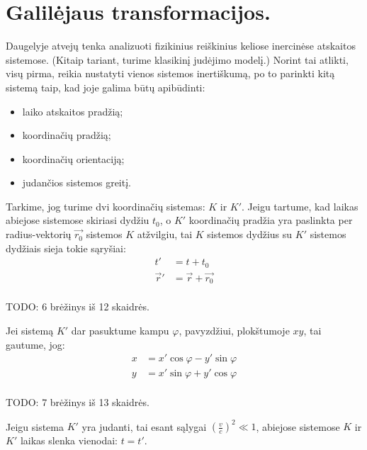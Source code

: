 \section{Galilėjaus transformacijos.}

Daugelyje atvejų tenka analizuoti fizikinius reiškinius keliose
inercinėse atskaitos sistemose. (Kitaip tariant, turime klasikinį
judėjimo modelį.) Norint tai atlikti, visų pirma, reikia nustatyti
vienos sistemos inertiškumą, po to parinkti kitą sistemą taip, kad
joje galima būtų apibūdinti:
\begin{itemize}
  \item laiko atskaitos pradžią;
  \item koordinačių pradžią;
  \item koordinačių orientaciją;
  \item judančios sistemos greitį.
\end{itemize}

Tarkime, jog turime dvi koordinačių sistemas: $K$ ir $K'$. Jeigu tartume,
kad laikas abiejose sistemose skiriasi dydžiu $t_{0}$, o $K'$ koordinačių
pradžia yra paslinkta per radius-vektorių $\vec{r_{0}}$ sistemos
$K$ atžvilgiu, tai $K$ sistemos dydžius su $K'$ sistemos dydžiais
sieja tokie sąryšiai:
\begin{align*}
  t' &= t + t_{0} \\
  \vec{r}' &= \vec{r} + \vec{r_{0}} \\
\end{align*}

TODO: 6 brėžinys iš 12 skaidrės.

Jei sistemą $K'$ dar pasuktume kampu $\varphi$, pavyzdžiui,
plokštumoje $xy$, tai gautume, jog:
\begin{align*}
  x &= x'\cos \varphi - y' \sin \varphi \\
  y &= x'\sin \varphi + y' \cos \varphi \\
\end{align*}

TODO: 7 brėžinys iš 13 skaidrės.

Jeigu sistema $K'$ yra judanti, tai esant sąlygai
$\left( \frac{v}{c} \right)^{2} \ll 1$, abiejose sistemose
$K$ ir $K'$ laikas slenka vienodai: $t = t'$.


